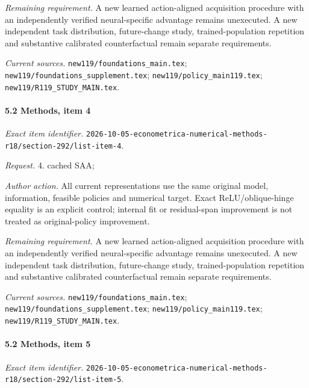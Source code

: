 \par\emph{Remaining requirement.} A new learned action-aligned acquisition procedure with an independently verified neural-specific advantage remains unexecuted. A new independent task distribution, future-change study, trained-population repetition and substantive calibrated counterfactual remain separate requirements.

\par\emph{Current sources.} \nolinkurl{new119/foundations_main.tex}; \nolinkurl{new119/foundations_supplement.tex}; \nolinkurl{new119/policy_main119.tex}; \nolinkurl{new119/R119_STUDY_MAIN.tex}.

\paragraph{5.2 Methods, item 4}

\emph{Exact item identifier.} \nolinkurl{2026-10-05-econometrica-numerical-methods-r18/section-292/list-item-4}.

\par\emph{Request.} 4. cached SAA;

\par\emph{Author action.} All current representations use the same original model, information, feasible policies and numerical target. Exact ReLU/\allowbreak{}oblique-hinge equality is an explicit control; internal fit or residual-span improvement is not treated as original-policy improvement.

\par\emph{Remaining requirement.} A new learned action-aligned acquisition procedure with an independently verified neural-specific advantage remains unexecuted. A new independent task distribution, future-change study, trained-population repetition and substantive calibrated counterfactual remain separate requirements.

\par\emph{Current sources.} \nolinkurl{new119/foundations_main.tex}; \nolinkurl{new119/foundations_supplement.tex}; \nolinkurl{new119/policy_main119.tex}; \nolinkurl{new119/R119_STUDY_MAIN.tex}.

\paragraph{5.2 Methods, item 5}

\emph{Exact item identifier.} \nolinkurl{2026-10-05-econometrica-numerical-methods-r18/section-292/list-item-5}.

